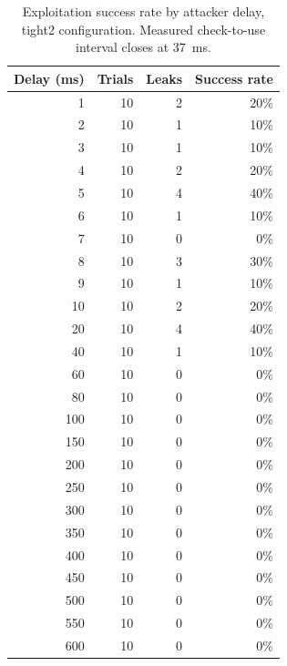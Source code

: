 \begin{table}[ht]
\centering
\begin{tabular}{rrrr}
\hline
Delay (ms) & Trials & Leaks & Success rate \\
\hline
1 & 10 & 2 & 20\% \\
2 & 10 & 1 & 10\% \\
3 & 10 & 1 & 10\% \\
4 & 10 & 2 & 20\% \\
5 & 10 & 4 & 40\% \\
6 & 10 & 1 & 10\% \\
7 & 10 & 0 & 0\% \\
8 & 10 & 3 & 30\% \\
9 & 10 & 1 & 10\% \\
10 & 10 & 2 & 20\% \\
20 & 10 & 4 & 40\% \\
40 & 10 & 1 & 10\% \\
60 & 10 & 0 & 0\% \\
80 & 10 & 0 & 0\% \\
100 & 10 & 0 & 0\% \\
150 & 10 & 0 & 0\% \\
200 & 10 & 0 & 0\% \\
250 & 10 & 0 & 0\% \\
300 & 10 & 0 & 0\% \\
350 & 10 & 0 & 0\% \\
400 & 10 & 0 & 0\% \\
450 & 10 & 0 & 0\% \\
500 & 10 & 0 & 0\% \\
550 & 10 & 0 & 0\% \\
600 & 10 & 0 & 0\% \\
\hline
\end{tabular}
\caption{Exploitation success rate by attacker delay, tight2 configuration. Measured check-to-use interval closes at 37~ms.}
\label{tab:success-tight2}
\end{table}

